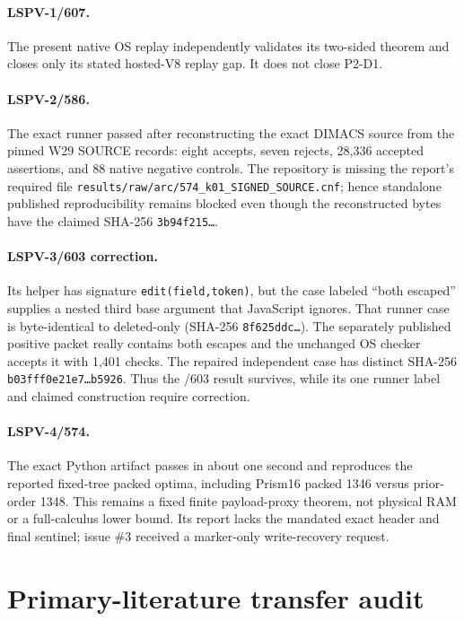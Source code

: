 \documentclass[11pt]{article}
\begin{document}
\paragraph{LSPV-1/607.} The present native OS replay independently validates its
two-sided theorem and closes only its stated hosted-V8 replay gap.  It does not
close P2-D1.

\paragraph{LSPV-2/586.} The exact runner passed after reconstructing the exact
DIMACS source from the pinned W29 SOURCE records: eight accepts, seven rejects,
28,336 accepted assertions, and 88 native negative controls.  The repository is
missing the report's required file
\texttt{results/raw/arc/574\_k01\_SIGNED\_SOURCE.cnf}; hence standalone published
reproducibility remains blocked even though the reconstructed bytes have the
claimed SHA-256 \texttt{3b94f215\ldots}.

\paragraph{LSPV-3/603 correction.} Its helper has signature
\texttt{edit(field,token)}, but the case labeled ``both escaped'' supplies a nested
third base argument that JavaScript ignores.  That runner case is byte-identical
to deleted-only (SHA-256 \texttt{8f625ddc\ldots}).  The separately published
positive packet really contains both escapes and the unchanged OS checker accepts
it with 1,401 checks.  The repaired independent case has distinct SHA-256
\texttt{b03fff0e21e7\ldots b5926}.  Thus the /603 result survives, while its one
runner label and claimed construction require correction.

\paragraph{LSPV-4/574.} The exact Python artifact passes in about one second and
reproduces the reported fixed-tree packed optima, including Prism16 packed 1346
versus prior-order 1348.  This remains a fixed finite payload-proxy theorem, not
physical RAM or a full-calculus lower bound.  Its report lacks the mandated exact
header and final sentinel; issue \#3 received a marker-only write-recovery request.

\section{Primary-literature transfer audit}
\end{document}
